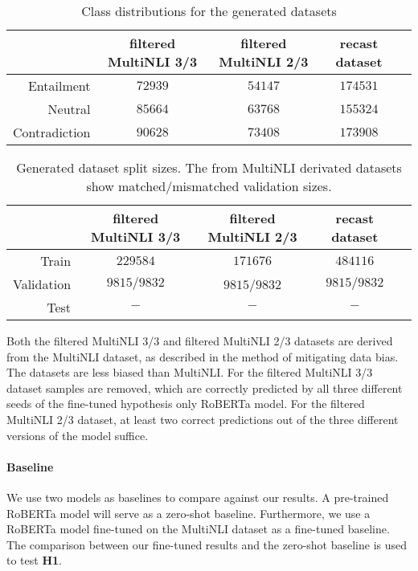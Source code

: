 \begin{table*}[ht]
    \centering
    \caption{Class distributions for the generated datasets}
    \begin{tabular}{r || c | c | c | c}
        &  filtered \acs{MultiNLI} 3/3 & filtered \acs{MultiNLI} 2/3 & recast dataset \\
        \midrule
      Entailment  & $72939$ & $54147$ & $174531$ \\
      Neutral  & $85664$ & $63768$ & $155324$\\
      Contradiction  & $90628$ & $73408$ & $173908$
    \end{tabular}
    \label{tab:new_datasets:classes}
\end{table*}

\begin{table*}[h]
    \centering
    \caption{Generated dataset split sizes. The from \acs{MultiNLI} derivated datasets show matched/mismatched validation sizes.}
    \begin{tabular}{r || c | c | c | c}
        & filtered \acs{MultiNLI} 3/3 & filtered \acs{MultiNLI} 2/3 & recast dataset \\
        \midrule
      Train &  $229584$ & $171676$ & $484116$ \\
      Validation  & $9815/9832$ & $9815$/$9832$ & $9815/9832$ \\
      Test  & $ - $ & $ - $ & $ - $
    \end{tabular}
    \label{tab:new_datasets:sizes}
\end{table*}

Both the filtered \acs{MultiNLI} 3/3 and filtered \acs{MultiNLI} 2/3 datasets are derived from the \acs{MultiNLI} dataset, as described in the method of mitigating data bias. The datasets are less biased than \acs{MultiNLI}. For the filtered \acs{MultiNLI} 3/3 dataset samples are removed, which are correctly predicted by all three different seeds of the fine-tuned hypothesis only \acs{RoBERTa} model. For the filtered \acs{MultiNLI} 2/3 dataset, at least two correct predictions out of the three different versions of the model suffice.



\paragraph{Baseline}
We use two models as baselines to compare against our results. A pre-trained \ac{RoBERTa} model will serve as a zero-shot baseline. Furthermore, we use a \ac{RoBERTa} model fine-tuned on the \ac{MultiNLI} dataset as a fine-tuned baseline. The comparison between our fine-tuned results and the zero-shot baseline is used to test \textbf{H1}.

